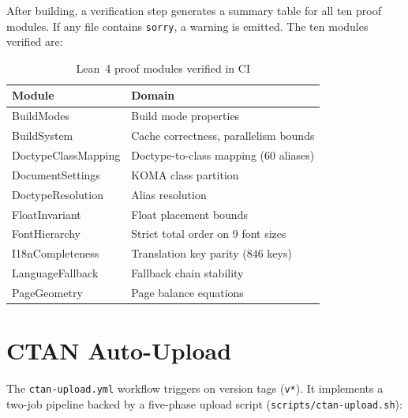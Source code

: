 After building, a verification step generates a summary table for all ten
proof modules.  If any file contains \texttt{sorry}, a warning is emitted.
The ten modules verified are:

\begin{table}[htbp]
  \centering
  \begin{tabular}{@{} l l @{}}
    \toprule
    \textbf{Module} & \textbf{Domain} \\
    \midrule
    BuildModes & Build mode properties \\
    BuildSystem & Cache correctness, parallelism bounds \\
    DoctypeClassMapping & Doctype-to-class mapping (60 aliases) \\
    DocumentSettings & KOMA class partition \\
    DoctypeResolution & Alias resolution \\
    FloatInvariant & Float placement bounds \\
    FontHierarchy & Strict total order on 9 font sizes \\
    I18nCompleteness & Translation key parity (846 keys) \\
    LanguageFallback & Fallback chain stability \\
    PageGeometry & Page balance equations \\
    \bottomrule
  \end{tabular}
  \caption{Lean~4 proof modules verified in CI}
\end{table}

\section{CTAN Auto-Upload}

The \texttt{ctan-upload.yml} workflow triggers on version tags
(\texttt{v*}).  It implements a two-job pipeline backed by a five-phase
upload script (\texttt{scripts/ctan-upload.sh}):

